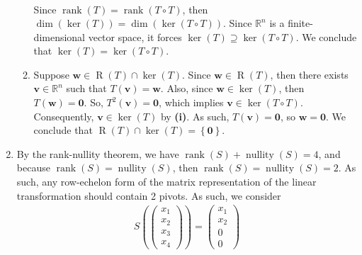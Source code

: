 \documentclass[12pt]{article}
\begin{document}
\begin{enumerate}[label=\textbf{(\alph*)}]
\begin{enumerate}[label=\textbf{(\roman*)}]
\begin{align*}
        \end{align*}
        Since $\operatorname{rank}\left(T\right)=\operatorname{rank}\left(T\circ T\right)$, then $\operatorname{dim}\left(\operatorname{ker}\left(T\right)\right)=\operatorname{dim}\left(\operatorname{ker}\left(T\circ T\right)\right)$. Since $\mathbb{R}^n$ is a finite-dimensional vector space, it forces $\operatorname{ker}\left(T\right)\supseteq \operatorname{ker}\left(T\circ T\right)$. We conclude that $\operatorname{ker}\left(T\right)= \operatorname{ker}\left(T\circ T\right)$.
        \item Suppose $\mathbf{w}\in \operatorname{R}\left(T\right)\cap \operatorname{ker}\left(T\right)$. Since $\mathbf{w}\in \operatorname{R}\left(T\right)$, then there exists $\mathbf{v}\in \mathbb{R}^n$ such that $T\left(\mathbf{v}\right)=\mathbf{w}$. Also, since $\mathbf{w}\in\operatorname{ker}\left(T\right)$, then $T\left(\mathbf{w}\right)=\mathbf{0}$. So, $T^2\left(\mathbf{v}\right)=\mathbf{0}$, which implies $\mathbf{v}\in \operatorname{ker}\left(T\circ T\right)$.
        \newline
        \newline Consequently, $\mathbf{v}\in\operatorname{ker}\left(T\right)$ by \textbf{(i)}. As such, $T\left(\mathbf{v}\right)=\mathbf{0}$, so $\mathbf{w}=\mathbf{0}$. We conclude that $\operatorname{R}\left(T\right)\cap \operatorname{ker}\left(T\right)=\left\{\mathbf{0}\right\}$.
    \end{enumerate}
    \item By the rank-nullity theorem, we have $\operatorname{rank}\left(S\right)+\operatorname{nullity}\left(S\right)=4$, and because $\operatorname{rank}\left(S\right)=\operatorname{nullity}\left(S\right)$, then $\operatorname{rank}\left(S\right)=\operatorname{nullity}\left(S\right)=2$. As such, any row-echelon form of the matrix representation of the linear transformation should contain 2 pivots. As such, we consider \begin{align*}
        S\left(\begin{pmatrix}
            x_1\\x_2\\x_3\\x_4
        \end{pmatrix}\right)=\begin{pmatrix}
            x_1 \\ x_2\\0\\0
        \end{pmatrix}
    \end{align*}

\end{enumerate}
\end{document}
